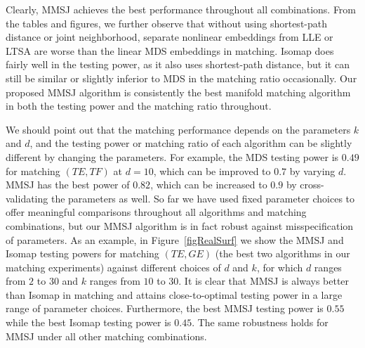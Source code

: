 \documentclass[times,twocolumn,final]{elsarticle}
\begin{document}
Clearly, MMSJ achieves the best performance throughout all combinations. From the tables and figures, we further observe that without using shortest-path distance or joint neighborhood, separate nonlinear embeddings from LLE or LTSA are worse than the linear MDS embeddings in matching. Isomap does fairly well in the testing power, as it also uses shortest-path distance, but it can still be similar or slightly inferior to MDS in the matching ratio occasionally. Our proposed MMSJ algorithm is consistently the best manifold matching algorithm in both the testing power and the matching ratio throughout.

We should point out that the matching performance depends on the parameters $k$ and $d$, and the testing power or matching ratio of each algorithm can be slightly different by changing the parameters. For example, the MDS testing power is $0.49$ for matching $(TE, TF)$ at $d=10$, which can be improved to $0.7$ by varying $d$. MMSJ has the best power of $0.82$, which can be increased to $0.9$ by cross-validating the parameters as well. So far we have used fixed parameter choices to offer meaningful comparisons throughout all algorithms and matching combinations, but our MMSJ algorithm is in fact robust against misspecification of parameters. As an example, in Figure~\ref{figRealSurf} we show the MMSJ and Isomap testing powers for matching $(TE,GE)$ (the best two algorithms in our matching experiments) against different choices of $d$ and $k$, for which $d$ ranges from $2$ to $30$ and $k$ ranges from $10$ to $30$. It is clear that MMSJ is always better than Isomap in matching and attains close-to-optimal testing power in a large range of parameter choices. Furthermore, the best MMSJ testing power is $0.55$ while the best Isomap testing power is $0.45$. The same robustness holds for MMSJ under all other matching combinations. 

\end{document}
